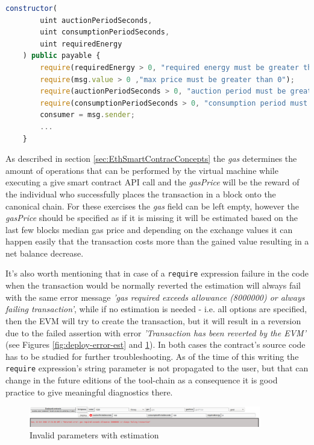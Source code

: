 \documentclass[a4paper]{article}
\begin{document}
\begin{lstlisting}[language=javascript,caption={Excerpt from the constructor of the Powerbid smart contract},label={lst:powerbid-ctor}]
    constructor(
        uint auctionPeriodSeconds,
        uint consumptionPeriodSeconds,
        uint requiredEnergy
    ) public payable {
        require(requiredEnergy > 0, "required energy must be greater than 0 wh");
        require(msg.value > 0 ,"max price must be greater than 0");
        require(auctionPeriodSeconds > 0, "auction period must be greater than 0");
        require(consumptionPeriodSeconds > 0, "consumption period must be greater than 0");
        consumer = msg.sender;
        ...
    }
\end{lstlisting}

As described in section \ref{sec:EthSmartContracConcepts} the \emph{gas} determines the amount of operations that can be performed by the virtual machine while executing a give smart contract API call and the \emph{gasPrice} will be the reward of the individual who successfully places the transaction in a block onto the canonical chain. For these exercises the \emph{gas} field can be left empty, however the \emph{gasPrice} should be specified as if it is missing it will be estimated based on the last few blocks median gas price and depending on the exchange values it can happen easily that the transaction costs more than the gained value resulting in a net balance decrease.

It's also worth mentioning that in case of a \verb!require! expression failure in the code when the transaction would be normally reverted the estimation will always fail with the same error message \emph{'gas required exceeds allowance (8000000) or always failing transaction'}, while if no estimation is needed - i.e. all options are specified, then the EVM will try to create the transaction, but it will result in a reversion due to the failed assertion with error \emph{'Transaction has been reverted by the EVM'} (see Figures \ref{fig:deploy-error-est} and \ref{fig:deploy-error-noest}). In both cases the contract's source code has to be studied for further troubleshooting. As of the time of this writing the \verb!require! expression's string parameter is not propagated to the user, but that can change in the future editions of the tool-chain as a consequence it is good practice to give meaningful diagnostics there.

\begin{figure}[H]
    \centering
    \includegraphics[width=0.9\textwidth]{figures/error-withestimation.png}
    \caption{Invalid parameters with estimation}
    \label{fig:deploy-error-noest}
\end{figure}
\end{document}
